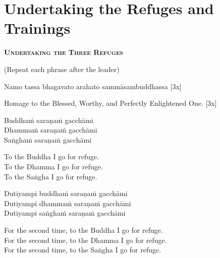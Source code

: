 \section{Undertaking the Refuges and Trainings}

\vspace{1em}

\begin{center}
  \textbf{\textsc{Undertaking the Three Refuges}}\hyperlink{endnote138-appendix}{\hypertarget{endnote138-body}{}}
\end{center}

\begin{center}
  (Repeat each phrase after the leader)
\end{center}

Namo tassa bhagavato arahato sammāsambuddhassa \hfill{[3x]}

\begin{english}
  Homage to the Blessed, Worthy, and Perfectly Enlightened One. \hfill{[3x]}
\end{english}

Buddhaṁ saraṇaṁ gacchāmi\\
Dhammaṁ saraṇaṁ gacchāmi\\
Saṅghaṁ saraṇaṁ gacchāmi

\begin{english-verses}
  To the Buddha I go for refuge.\\
  To the Dhamma I go for refuge.\\
  To the Saṅgha I go for refuge.
\end{english-verses}

Dutiyampi buddhaṁ saraṇaṁ gacchāmi\\
Dutiyampi dhammaṁ saraṇaṁ gacchāmi\\
Dutiyampi saṅghaṁ saraṇaṁ gacchāmi

\begin{english-verses}
  For the second time, to the Buddha I go for refuge.\\
  For the second time, to the Dhamma I go for refuge.\\
  For the second time, to the Saṅgha I go for refuge.
\end{english-verses}

